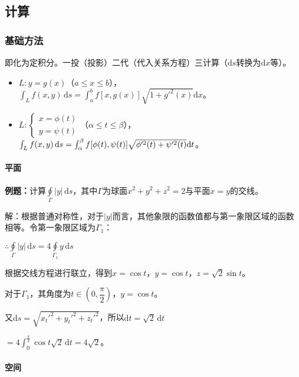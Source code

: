 \subsection{计算}

\subsubsection{基础方法}

即化为定积分。一投（投影）二代（代入关系方程）三计算（$\textrm{d}s$转换为$\textrm{d}x$等）。

\begin{itemize}
    \item $L:y=g(x)$（$a\leqslant x\leqslant b$），$\int_Lf(x,y)\,\textrm{d}s=\int_a^bf[x,g(x)]\sqrt{1+g'^2(x)}\textrm{d}x$。
    \item $L:\left\{\begin{array}{c}
        x=\phi(t) \\
        y=\psi(t)
    \end{array}\right.$（$\alpha\leqslant t\leqslant\beta$），$\int_Lf(x,y)\,\textrm{d}s=\int_\alpha^\beta f[\phi(t),\psi(t)]\\\sqrt{\phi'^2(t)+\psi'^2(t)}\textrm{d}t$。 
\end{itemize}

\paragraph{平面} \leavevmode \medskip

\textbf{例题：}计算$\oint\limits_\Gamma\vert y\vert\,\textrm{d}s$，其中$\Gamma$为球面$x^2+y^2+z^2=2$与平面$x=y$的交线。

解：根据普通对称性，对于$\vert y\vert$而言，其他象限的函数值都与第一象限区域的函数相等。令第一象限区域为$\Gamma_1$：

$\therefore\oint\limits_\Gamma\vert y\vert\,\textrm{d}s=4\oint\limits_{\Gamma_1}y\,\textrm{d}s$

根据交线方程进行联立，得到$x=\cos t$，$y=\cos t$，$z=\sqrt{2}\sin t$。

对于$\Gamma_1$，其角度为$t\in\left(0,\dfrac{\pi}{2}\right)$，$y=\cos t$。

又$\textrm{d}s=\sqrt{x_t'^2+y_t'^2+z_t'^2}$，所以$\textrm{d}t=\sqrt{2}\,\textrm{d}t$

$=4\int_0^\frac{\pi}{2}\cos t\sqrt{2}\,\textrm{d}t=4\sqrt{2}$。

\paragraph{空间} \leavevmode \medskip

